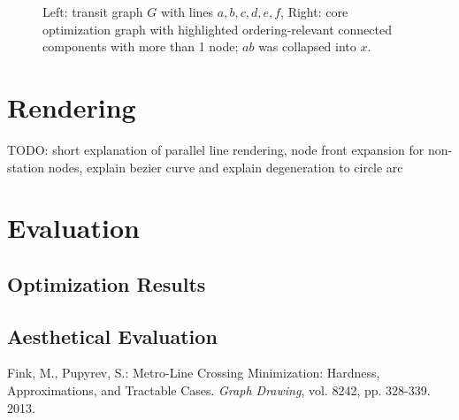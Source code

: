 \documentclass{llncs}
\begin{document}
\begin{figure}[h]

	\caption{Left: transit graph $G$ with lines $a, b, c, d, e, f$, Right: core optimization graph with highlighted ordering-relevant connected components with more than 1 node; $ab$ was collapsed into $x$.}
\end{figure}

\section{Rendering}

TODO: short explanation of parallel line rendering, node front expansion for non-station nodes, explain bezier curve and explain degeneration to circle arc

\section{Evaluation}


\subsection{Optimization Results}

\subsection{Aesthetical Evaluation}


%
%
\begin{thebibliography}{5}
%
Fink, M., Pupyrev, S.:
Metro-Line Crossing Minimization: Hardness, Approximations, and Tractable Cases.
\textit{Graph Drawing}, vol. 8242, pp. 328-339. 2013.

\end{thebibliography}
\end{document}
